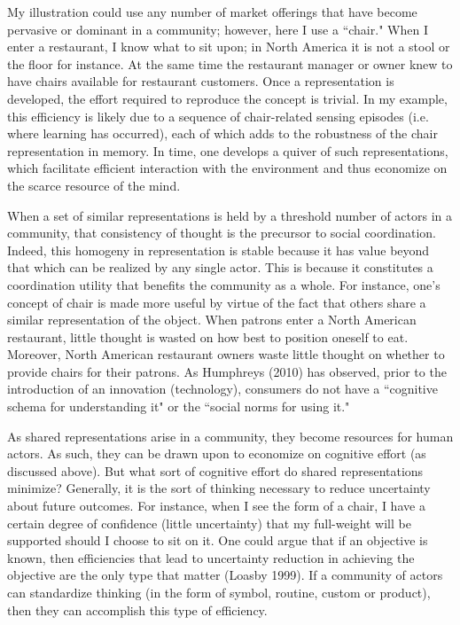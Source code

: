 My illustration could use any number of market offerings that have become pervasive or dominant in a community; however, here I use a ``chair." When I enter a restaurant, I know what to sit upon; in North America it is not a stool or the floor for instance. At the same time the restaurant manager or owner knew to have chairs available for restaurant customers. Once a representation is developed, the effort required to reproduce the concept is trivial. In my example, this efficiency is likely due to a sequence of chair-related sensing episodes (i.e. where learning has occurred), each of which adds to the robustness of the chair representation in memory. In time, one develops a quiver of such representations, which facilitate efficient interaction with the environment  and thus economize on the scarce resource of the mind. 

When a set of similar representations is held by a threshold number of actors in a community, that consistency of thought is the precursor to social coordination. Indeed, this homogeny in representation is stable because it has value beyond that which can be realized by any single actor. This is because it constitutes a coordination utility that benefits the community as a whole. For instance, one's concept of chair is made more useful by virtue of the fact that others share a similar representation of the object. When patrons enter a North American restaurant, little thought is wasted on how best to position oneself to eat. Moreover, North American restaurant owners waste little thought on whether to provide chairs for their patrons. As Humphreys (2010) has observed, prior to the introduction of an innovation (technology), consumers do not have a ``cognitive schema for understanding it" or the ``social norms for using it." 

As shared representations arise in a community, they become resources for human actors. As such, they can be drawn upon to economize on cognitive effort (as discussed above). But what sort of cognitive effort do shared representations minimize? Generally, it is the sort of thinking necessary to reduce uncertainty about future outcomes. For instance, when I see the form of a chair, I have a certain degree of confidence (little uncertainty) that my full-weight will be supported should I choose to sit on it. One could argue that if an objective is known, then efficiencies that lead to uncertainty reduction in achieving the objective are the only type that matter (Loasby 1999). If a community of actors can standardize thinking (in the form of symbol, routine, custom or product), then they can accomplish this type of efficiency. 

